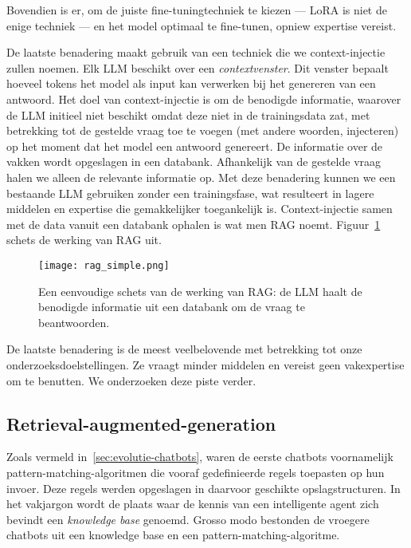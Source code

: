 Bovendien is er, om de juiste fine-tuningtechniek te kiezen --- LoRA is niet de enige techniek --- en het model optimaal te fine-tunen, opniew expertise vereist.

De laatste benadering maakt gebruik van een techniek die we context-injectie zullen noemen. Elk \acrshort{LLM} beschikt over een \emph{contextvenster}. Dit venster bepaalt hoeveel tokens het model als input kan verwerken bij het genereren van een antwoord. Het doel van context-injectie is om de benodigde informatie, waarover de \acrshort{LLM} initieel niet beschikt omdat deze niet in de trainingsdata zat, met betrekking tot de gestelde vraag toe te voegen (met andere woorden, injecteren) op het moment dat het model een antwoord genereert. De informatie over de vakken wordt opgeslagen in een databank. Afhankelijk van de gestelde vraag halen we alleen de relevante informatie op. Met deze benadering kunnen we een bestaande LLM gebruiken zonder een trainingsfase, wat resulteert in lagere middelen en expertise die gemakkelijker toegankelijk is. Context-injectie samen met de data vanuit een databank ophalen is wat men \acrfull{RAG} noemt. Figuur~\ref{fig:rag_simple} schets de werking van \acrshort{RAG} uit. 

\begin{figure}
    \centering
    \texttt{[image: rag\_simple.png]}
    \caption[Schets van RAG]{\label{fig:rag_simple}Een eenvoudige schets van de werking van \acrshort{RAG}: de \acrshort{LLM} haalt de benodigde informatie uit een databank om de vraag te beantwoorden.}
\end{figure}

De laatste benadering is de meest veelbelovende met betrekking tot onze onderzoeksdoelstellingen. Ze vraagt minder middelen en vereist geen vakexpertise om te benutten. We onderzoeken deze piste verder.

\subsection{Retrieval-augmented-generation}%
\label{subsec:rag}

Zoals vermeld in~\ref{sec:evolutie-chatbots}, waren de eerste chatbots voornamelijk pattern-matching-algoritmen die vooraf gedefinieerde regels toepasten op hun invoer. Deze regels werden opgeslagen in daarvoor geschikte opslagstructuren. In het vakjargon wordt de plaats waar de kennis van een intelligente agent zich bevindt een \emph{knowledge base} genoemd. Grosso modo bestonden de vroegere chatbots uit een knowledge base en een pattern-matching-algoritme.

